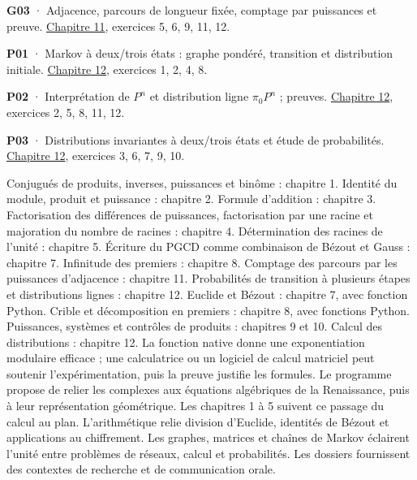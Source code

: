\noindent\textbf{G03} · Adjacence, parcours de longueur fixée, comptage par puissances et preuve. \hyperref[chap-11]{Chapitre 11}, exercices 5, 6, 9, 11, 12.\par\vspace{1.7mm}
\noindent\textbf{P01} · Markov à deux/trois états : graphe pondéré, transition et distribution initiale. \hyperref[chap-12]{Chapitre 12}, exercices 1, 2, 4, 8.\par\vspace{1.7mm}
\noindent\textbf{P02} · Interprétation de $P^n$ et distribution ligne $\pi_0P^n$ ; preuves. \hyperref[chap-12]{Chapitre 12}, exercices 2, 5, 8, 11, 12.\par\vspace{1.7mm}
\noindent\textbf{P03} · Distributions invariantes à deux/trois états et étude de probabilités. \hyperref[chap-12]{Chapitre 12}, exercices 3, 6, 7, 9, 10.\par\vspace{1.7mm}
Conjugués de produits, inverses, puissances et binôme : chapitre 1.
Identité du module, produit et puissance : chapitre 2.
Formule d'addition : chapitre 3.
Factorisation des différences de puissances, factorisation par une racine et majoration du nombre de racines : chapitre 4.
Détermination des racines de l'unité : chapitre 5.
Écriture du PGCD comme combinaison de Bézout et Gauss : chapitre 7.
Infinitude des premiers : chapitre 8.
Comptage des parcours par les puissances d'adjacence : chapitre 11.
Probabilités de transition à plusieurs étapes et distributions lignes : chapitre 12.
Euclide et Bézout : chapitre 7, avec fonction Python.
Crible et décomposition en premiers : chapitre 8, avec fonctions Python.
Puissances, systèmes et contrôles de produits : chapitres 9 et 10.
Calcul des distributions : chapitre 12.
La fonction native  donne une exponentiation modulaire efficace ; une calculatrice ou un logiciel de calcul matriciel peut soutenir l'expérimentation, puis la preuve justifie les formules.
Le programme propose de relier les complexes aux équations algébriques de la Renaissance, puis à leur représentation géométrique. Les chapitres 1 à 5 suivent ce passage du calcul au plan.
L'arithmétique relie division d'Euclide, identités de Bézout et applications au chiffrement.
Les graphes, matrices et chaînes de Markov éclairent l'unité entre problèmes de réseaux, calcul et probabilités. Les dossiers fournissent des contextes de recherche et de communication orale.
